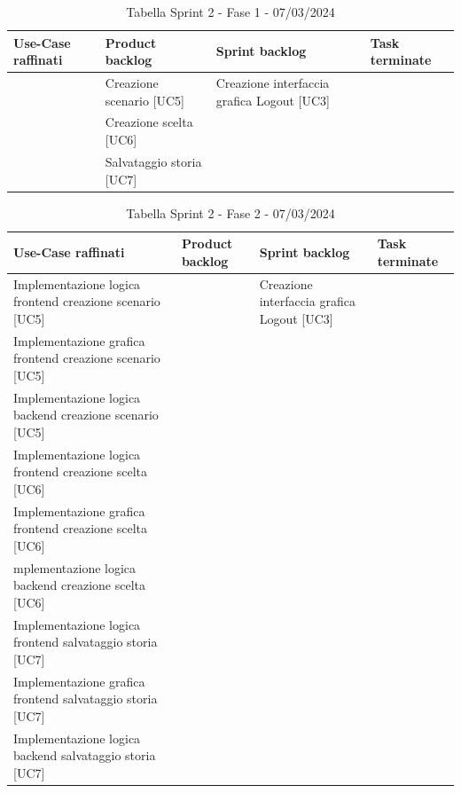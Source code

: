 \documentclass{article}
\begin{document}
\begin{table}[h]
    \centering
    \begin{tabularx}{\textwidth}{|X|X|X|X|}
        \hline
        \bf Use-Case raffinati & \bf Product backlog & \bf Sprint backlog & \bf Task terminate \\
        \hline
        & Creazione scenario [UC5] & Creazione interfaccia grafica Logout [UC3] & \\
        \hline
        & Creazione scelta [UC6] & & \\
        \hline
        & Salvataggio storia [UC7] & & \\
        \hline
    \end{tabularx}
    \caption*{Tabella Sprint 2 - Fase 1 - 07/03/2024}
\end{table}

\begin{table}[h]
    \centering
    \begin{tabularx}{\textwidth}{|X|X|X|X|}
        \hline
        \bf Use-Case raffinati & \bf Product backlog & \bf Sprint backlog & \bf Task terminate \\
        \hline
        Implementazione logica frontend creazione scenario [UC5] & & Creazione interfaccia grafica Logout [UC3] & \\
        \hline
        Implementazione grafica frontend creazione scenario [UC5] & & & \\
        \hline
        Implementazione logica backend creazione scenario [UC5] & & & \\
        \hline
        Implementazione logica frontend creazione scelta [UC6] & & & \\
        \hline
        Implementazione grafica frontend creazione scelta [UC6] & & & \\
        \hline
        mplementazione logica backend creazione scelta [UC6] & & & \\
        \hline
        Implementazione logica frontend salvataggio storia [UC7] & & & \\
        \hline
        Implementazione grafica frontend salvataggio storia [UC7] & & & \\
        \hline
        Implementazione logica backend salvataggio storia [UC7] & & & \\
        \hline
    \end{tabularx}
    \caption*{Tabella Sprint 2 - Fase 2 - 07/03/2024}
\end{table}
\end{document}
